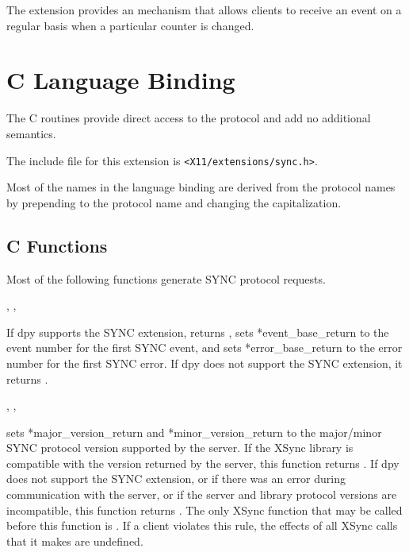 The extension provides an  mechanism that allows clients to
receive an event on a regular basis when a particular counter is changed.

\section{C Language Binding}

The C routines provide direct access to	the protocol and add
no additional semantics.

The include file for this extension is \verb|<X11/extensions/sync.h>|.

Most of the names in the language binding are derived from the
protocol names by prepending  to the protocol name and changing
the capitalization.

\subsection{C Functions}

Most of the following functions generate SYNC protocol requests.

,
,
\cendfunctiondecl

If dpy supports the SYNC extension, 
returns , sets *event\_base\_return to the event number for the
first SYNC event, and sets
*error\_base\_return to the error number for the first SYNC
error.  If dpy does not support the SYNC extension, it
returns .
\cendfuncdescription


,
,
\cendfunctiondecl

 sets *major\_version\_return and
*minor\_version\_return to the major/minor SYNC protocol
version supported by the server.  If the XSync library is compatible
with the version returned by the server, this function returns .
If dpy does not support the SYNC extension, or if there was an error during
communication with the server, or if the server and library protocol
versions are incompatible, this function returns .  The only
XSync function that may be called before this function is
.  If a client violates this rule,
the effects of all XSync calls that it makes are undefined.
\cendfuncdescription


